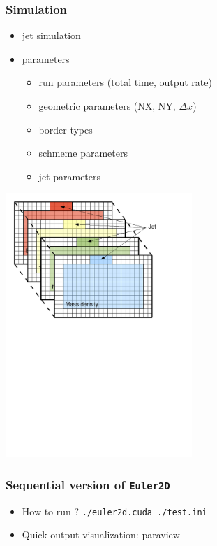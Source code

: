 \begin{frame}
\frametitle{Simulation}

\begin{itemize}
\item jet simulation
\item parameters 
\begin{itemize}
\item run parameters (total time, output rate)
\item geometric parameters (NX, NY, $\Delta x$)
\item border types
\item schmeme parameters
\item jet parameters
\end{itemize}
\end{itemize}

\begin{center}
\includegraphics[height=10cm]{./images/Jet}
\end{center}

\end{frame}

\begin{frame}
\frametitle{Sequential version of \texttt{Euler2D}}

\begin{itemize}
\item How to run ?
  \texttt{./euler2d.cuda ./test.ini}
\item Quick output visualization: paraview
\end{itemize}

\end{frame}

